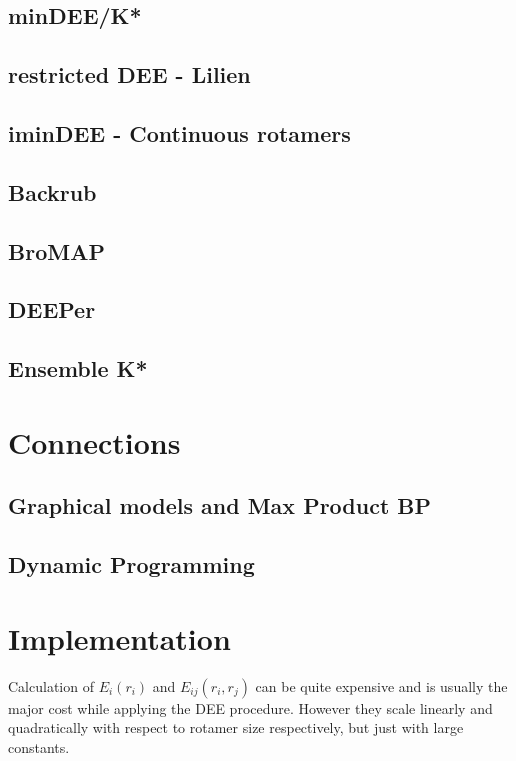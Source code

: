 \documentclass{article}
\begin{document}
\subsection{minDEE/K*}

\subsection{restricted DEE - Lilien}

\subsection{iminDEE - Continuous rotamers}

\subsection{Backrub}

\subsection{BroMAP}

\subsection{DEEPer}

\subsection{Ensemble K*}

\section{Connections}
\subsection{Graphical models and Max Product BP}

\subsection{Dynamic Programming}


\section{Implementation}
Calculation  of $E_i(r_i)$ and $E_{ij}(r_i,r_j)$ can be quite expensive and is usually the major cost while applying the DEE procedure. However they scale linearly and quadratically with respect to rotamer size respectively, but just with large constants. 
\end{document}
